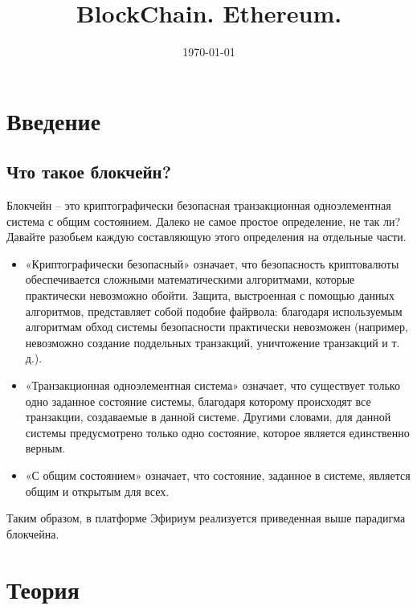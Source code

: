 \documentclass{article}
\begin{document}
\title{BlockChain. Ethereum.}

\date{\today}
\maketitle



\section{Введение}

\subsection{Что такое блокчейн?}

Блокчейн – это криптографически безопасная транзакционная одноэлементная система с общим состоянием. Далеко не самое простое определение, не так ли? Давайте разобьем каждую составляющую этого определения на отдельные части.



\begin{itemize}
 \item «Криптографически безопасный» означает, что безопасность криптовалюты обеспечивается сложными математическими алгоритмами, которые практически невозможно обойти. Защита, выстроенная с помощью данных алгоритмов, представляет собой подобие файрвола: благодаря используемым алгоритмам обход системы безопасности практически невозможен (например, невозможно создание поддельных транзакций, уничтожение транзакций и т. д.).
 \item «Транзакционная одноэлементная система» означает, что существует только одно заданное состояние системы, благодаря которому происходят все транзакции, создаваемые в данной системе. Другими словами, для данной системы предусмотрено только одно состояние, которое является единственно верным.
 \item «С общим состоянием» означает, что состояние, заданное в системе, является общим и открытым для всех.
\end{itemize}

Таким образом, в платформе Эфириум реализуется приведенная выше парадигма блокчейна. 

\section{Теория}
\end{document}
